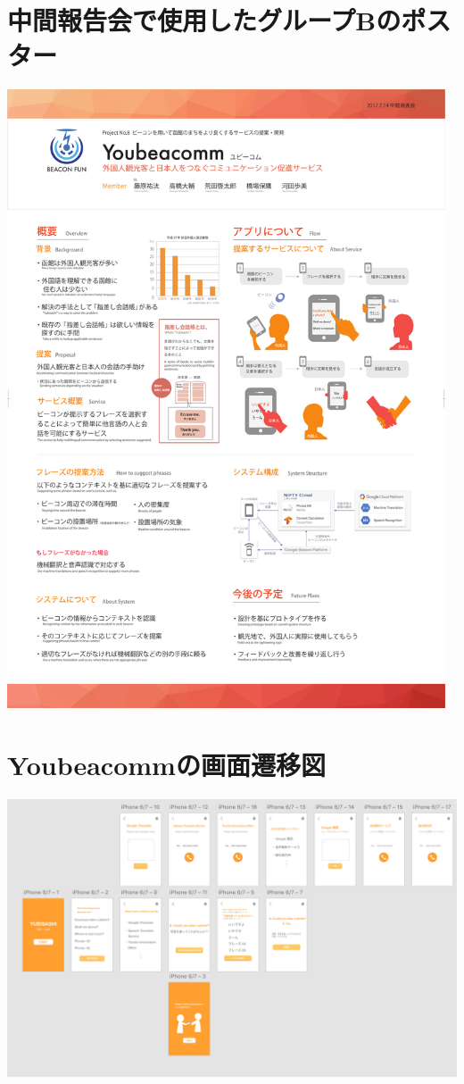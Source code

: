 \documentclass[openany,11pt,papersize]{jsbook}
\begin{document}
\begin{appendix}

\chapter{中間報告会で使用したグループBのポスター}
\begin{center}
\includegraphics[width=13cm]{gbt.pdf}
\end{center}

\chapter{Youbeacommの画面遷移図}
\begin{center}
\includegraphics[width=20cm,angle=90]{moc.png}
\end{center}


\end{appendix}
\end{document}
